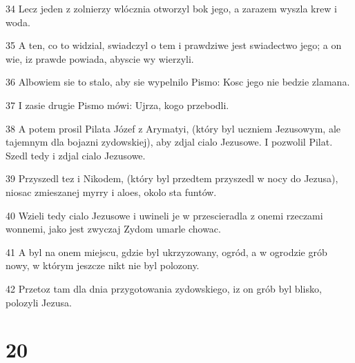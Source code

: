 \par 34 Lecz jeden z zolnierzy wlócznia otworzyl bok jego, a zarazem wyszla krew i woda.
\par 35 A ten, co to widzial, swiadczyl o tem i prawdziwe jest swiadectwo jego; a on wie, iz prawde powiada, abyscie wy wierzyli.
\par 36 Albowiem sie to stalo, aby sie wypelnilo Pismo: Kosc jego nie bedzie zlamana.
\par 37 I zasie drugie Pismo mówi: Ujrza, kogo przebodli.
\par 38 A potem prosil Pilata Józef z Arymatyi, (który byl uczniem Jezusowym, ale tajemnym dla bojazni zydowskiej), aby zdjal cialo Jezusowe. I pozwolil Pilat. Szedl tedy i zdjal cialo Jezusowe.
\par 39 Przyszedl tez i Nikodem, (który byl przedtem przyszedl w nocy do Jezusa), niosac zmieszanej myrry i aloes, okolo sta funtów.
\par 40 Wzieli tedy cialo Jezusowe i uwineli je w przescieradla z onemi rzeczami wonnemi, jako jest zwyczaj Zydom umarle chowac.
\par 41 A byl na onem miejscu, gdzie byl ukrzyzowany, ogród, a w ogrodzie grób nowy, w którym jeszcze nikt nie byl polozony.
\par 42 Przetoz tam dla dnia przygotowania zydowskiego, iz on grób byl blisko, polozyli Jezusa.

\chapter{20}

